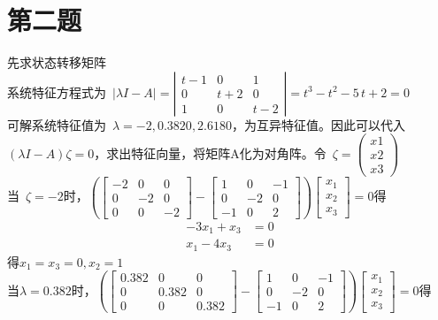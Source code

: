 \documentclass{article}
\begin{document}
\section*{第二题} 
先求状态转移矩阵\\
\mbox{系统特征方程式为 }$\left|{\lambda}I-A \right|=\left|\begin{array}{ccc} t - 1 & 0 & 1\\ 0 & t + 2 & 0\\ 1 & 0 & t - 2 \end{array}\right|=t^3 - t^2 - 5\, t + 2=0 $ \\
\mbox{可解系统特征值为 }$\lambda= -2,0.3820,2.6180$，为互异特征值。因此可以代入$({\lambda}I-A){\zeta}=0 $，求出特征向量，将矩阵A化为对角阵。\mbox{令 }$\zeta=\left(\begin{array}{ccc} x1 \\ x2 \\x3 \end{array}\right) $ \\
\mbox{当 }$\zeta=-2$时，$\left(\left[\begin{array}{ccc} -2 & 0 & 0 \\ 0 & -2 & 0 \\ 0 & 0 & -2 \end{array}\right]-\left[\begin{array}{ccc} 1 & 0 & -1 \\ 0 & -2 & 0 \\ -1 & 0 & 2 \end{array}\right]\right)\left[\begin{array}{ccc} x_{1} \\ x_{2}  \\ x_{3} \end{array}\right]=0$得 \\
\begin{align*}
-3x_1+x_3 &= 0 \\
x_1-4x_3 &= 0
\end{align*}
得$x_1=x_3=0,x_2=1$ \\
当$\lambda=0.382$时，$ \left(\left[\begin{array}{ccc} 0.382 & 0 & 0\\ 0 & 0.382 & 0\\ 0 & 0 & 0.382 \end{array}\right]-\left[\begin{array}{ccc} 1 & 0 & -1\\ 0 & -2 & 0\\ -1 & 0 & 2 \end{array}\right]\right)\left[\begin{array}{ccc} x_{1} \\ x_{2}  \\ x_{3} \end{array}\right]=0 $得\\
\end{document}
